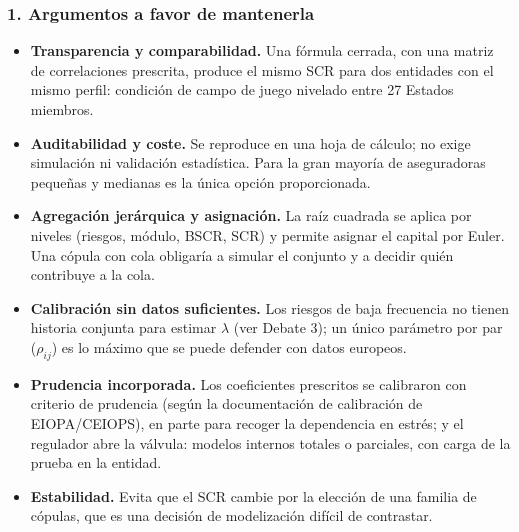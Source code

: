 \documentclass[a4paper,12pt]{article}
\begin{document}
\subsubsection*{1. Argumentos a favor de mantenerla}
\begin{itemize}[leftmargin=*,itemsep=2pt]
\item \textbf{Transparencia y comparabilidad.} Una fórmula cerrada, con una matriz de correlaciones prescrita, produce el mismo SCR para dos entidades con el mismo perfil: condición de \guillemotleft{}campo de juego nivelado\guillemotright{} entre 27 Estados miembros.
\item \textbf{Auditabilidad y coste.} Se reproduce en una hoja de cálculo; no exige simulación ni validación estadística. Para la gran mayoría de aseguradoras pequeñas y medianas es la única opción proporcionada.
\item \textbf{Agregación jerárquica y asignación.} La raíz cuadrada se aplica por niveles (riesgos, módulo, BSCR, SCR) y permite asignar el capital por Euler. Una cópula con cola obligaría a simular el conjunto y a decidir quién \guillemotleft{}contribuye\guillemotright{} a la cola.
\item \textbf{Calibración sin datos suficientes.} Los riesgos de baja frecuencia no tienen historia conjunta para estimar $\lambda$ (ver Debate 3); un único parámetro por par ($\rho_{ij}$) es lo máximo que se puede defender con datos europeos.
\item \textbf{Prudencia incorporada.} Los coeficientes prescritos se calibraron con criterio de prudencia (según la documentación de calibración de EIOPA/CEIOPS), en parte para recoger la dependencia en estrés; y el regulador abre la válvula: modelos internos totales o parciales, con carga de la prueba en la entidad.
\item \textbf{Estabilidad.} Evita que el SCR cambie por la elección de una familia de cópulas, que es una decisión de modelización difícil de contrastar.
\end{itemize}
\end{document}
